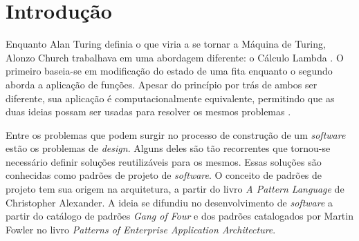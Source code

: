
\chapter{Introdução}
%


Enquanto Alan Turing definia o que viria a 
se tornar a Máquina de Turing, Alonzo Church 
trabalhava em uma abordagem diferente: o Cálculo Lambda
\cite{church1932set,church1936unsolvable,sep-turing-machine}. 
O primeiro baseia-se em modificação do estado de 
uma fita enquanto o segundo aborda a aplicação 
de funções. Apesar do princípio por trás de ambos 
ser diferente, sua aplicação é computacionalmente 
equivalente, permitindo que as duas ideias possam 
ser usadas para resolver os mesmos problemas
\cite{sep-church-turing}.


Entre os problemas que podem surgir no 
processo de construção de um \textit{software} 
estão os problemas de \textit{design}. Alguns 
deles são tão recorrentes que tornou-se 
necessário definir soluções reutilizáveis 
para os mesmos. Essas soluções são conhecidas 
como padrões de projeto de \textit{software}. 
\cite{gamma:1995} O conceito de padrões de 
projeto tem sua origem na arquitetura, a 
partir do livro \textit{A Pattern Language} 
de Christopher Alexander\cite{alexanderpatternlanguage}. 
A ideia se difundiu no desenvolvimento 
de \textit{software} a partir do catálogo de 
padrões \textit{Gang of Four} e dos padrões 
catalogados por Martin Fowler no livro 
\textit{Patterns of Enterprise Application Architecture}.
\cite{gamma:1995,fowler2002eea}

